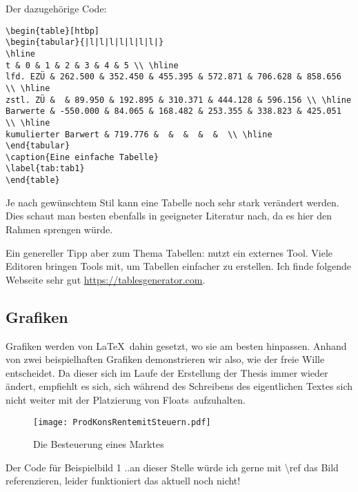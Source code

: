 Der dazugehörige Code:
\begin{lstlisting}[float=htpb,caption=Darstellungen einer Tabelle in \protect\LaTeX{},label=lst:bsptabelle]
\begin{table}[htbp]
\begin{tabular}{|l|l|l|l|l|l|l|}
\hline
t & 0 & 1 & 2 & 3 & 4 & 5 \\ \hline
lfd. EZÜ & 262.500 & 352.450 & 455.395 & 572.871 & 706.628 & 858.656 \\ \hline
zstl. ZÜ &  & 89.950 & 192.895 & 310.371 & 444.128 & 596.156 \\ \hline
Barwerte & -550.000 & 84.065 & 168.482 & 253.355 & 338.823 & 425.051 \\ \hline
kumulierter Barwert & 719.776 &  &  &  &  &  \\ \hline
\end{tabular}
\caption{Eine einfache Tabelle}
\label{tab:tab1}
\end{table}
\end{lstlisting}

Je nach gewünschtem Stil kann eine Tabelle noch sehr stark verändert werden. Dies schaut man besten ebenfalls in geeigneter Literatur nach, da es hier den Rahmen sprengen würde.

Ein genereller Tipp aber zum Thema Tabellen: nutzt ein externes Tool. Viele Editoren bringen Tools mit, um Tabellen einfacher zu erstellen. Ich finde folgende Webseite sehr gut \href{https://tablesgenerator.com}{https://tablesgenerator.com}.
\subsection{Grafiken}%
\label{sec:graphics}
Grafiken werden von \LaTeX{}\ dahin gesetzt, wo sie am besten hinpassen. Anhand von zwei beispielhaften Grafiken demonstrieren wir also, wie der freie Wille entscheidet. Da dieser sich im Laufe der Erstellung der Thesis immer wieder ändert, empfiehlt es sich, sich während des Schreibens des eigentlichen Textes sich nicht weiter mit der Platzierung von \glqq Floats\grqq\ aufzuhalten.

\begin{figure}[h!]
  \centering
     \texttt{[image: ProdKonsRentemitSteuern.pdf]}
     \caption{Die Besteuerung eines Marktes}
     \label{fig:bild}
\end{figure}

Der Code für Beispielbild 1%
..an dieser Stelle würde ich gerne mit \textbackslash ref das Bild referenzieren, leider funktioniert das aktuell noch nicht!

